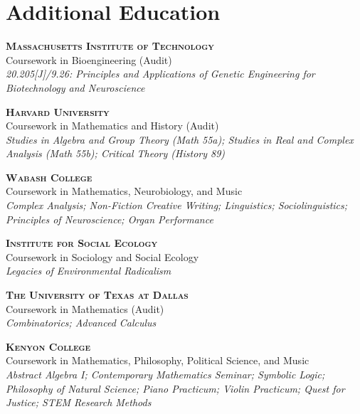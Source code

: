 \documentclass[11pt,letterpaper]{report} %
\begin{document}
    \section*{Additional Education}
    \begin{tablist}
        \item[2026]     \tab{}\small{\textbf{\textsc{Massachusetts Institute of Technology}}} \\
                              Coursework in Bioengineering (Audit) \\
                              \textit{20.205[J]/9.26: Principles and Applications of Genetic Engineering for Biotechnology and Neuroscience}
        \item[2025--26] \tab{}\small{\textbf{\textsc{Harvard University}}}\\
                              Coursework in Mathematics and History (Audit) \\
                              \textit{Studies in Algebra and Group Theory (Math 55a); Studies in Real and Complex Analysis (Math 55b); Critical Theory (History 89)}
        \item[2025]     \tab{}\small{\textbf{\textsc{Wabash College}}} \\
                              Coursework in Mathematics, Neurobiology, and Music \\
                              \textit{Complex Analysis; Non-Fiction Creative Writing; Linguistics; Sociolinguistics; Principles of Neuroscience; Organ Performance}
        \item[2024]     \tab{}\small{\textbf{\textsc{Institute for Social Ecology}}} \\
                              Coursework in Sociology and Social Ecology \\
                              \textit{Legacies of Environmental Radicalism}
        \item[2024]     \tab{}\small{\textbf{\textsc{The University of Texas at Dallas}}} \\
                              Coursework in Mathematics (Audit) \\
                              \textit{Combinatorics; Advanced Calculus}
        \item[2023--24] \tab{}\small{\textbf{\textsc{Kenyon College}}} \\
                              Coursework in Mathematics, Philosophy, Political Science, and Music \\
                              \textit{Abstract Algebra I; Contemporary Mathematics Seminar; Symbolic Logic; Philosophy of Natural Science; Piano Practicum; Violin Practicum; Quest for Justice; STEM Research Methods}
    \end{tablist}
\end{document}
